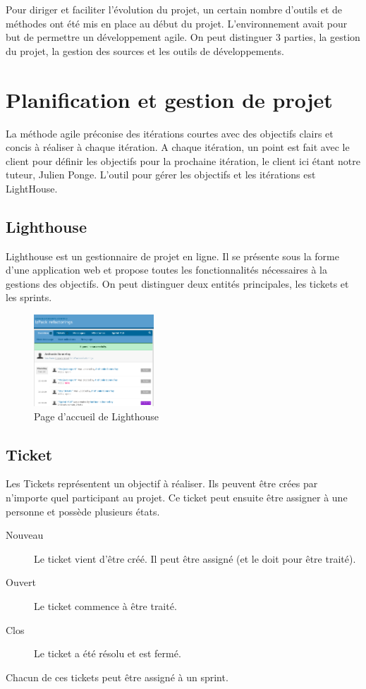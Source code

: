 Pour diriger et faciliter l'évolution du projet, un certain nombre d'outils et de méthodes ont été mis en place au début du projet.
L'environnement avait pour but de permettre un développement agile. On peut distinguer 3 parties, la gestion du projet, la gestion des sources et les outils de développements.
\section{Planification et gestion de projet}
La méthode agile préconise des itérations courtes avec des objectifs clairs et concis à réaliser à chaque itération.
A chaque itération, un point est fait avec le client pour définir les objectifs pour la prochaine itération, le client ici étant notre tuteur, Julien Ponge.
L'outil pour gérer les objectifs et les itérations est LightHouse.
\subsection{Lighthouse}
Lighthouse est un gestionnaire de projet en ligne.
Il se présente sous la forme d'une application web et propose toutes les fonctionnalités nécessaires à la gestions des objectifs.
On peut distinguer deux entités principales, les tickets et les sprints.
\begin{figure}[H]
	\centering
	\includegraphics[width=0.4\textwidth]{../image/lighthouse.png}
	\caption{Page d'accueil de Lighthouse}
\end{figure}
\subsection{Ticket}
Les Tickets représentent un objectif à réaliser.
Ils peuvent être crées par n'importe quel participant au projet. Ce ticket peut ensuite être assigner à une personne et possède plusieurs états.
\begin{description}
\item[Nouveau] Le ticket vient d'être créé. Il peut être assigné (et le doit pour être traité).
\item[Ouvert] Le ticket commence à être traité.
\item[Clos] Le ticket a été résolu et est fermé.
\end{description}
Chacun de ces tickets peut être assigné à un sprint.
